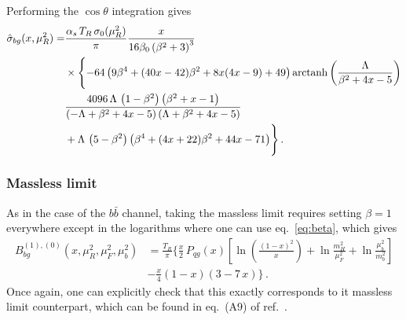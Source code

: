 Performing the $\cos\theta$ integration gives
\begin{equation}
  \begin{split}
    \hat{\sigma}_{bg}(x,\mu_R^2) =&
    \frac{\alpha_s\,T_R\,\sigma_0(\mu_R^2)}{\pi}\frac{  x}{16 \beta_0
      \left(\beta^2+3\right)^3}\\
    &\times\Biggl\{- 64 \left(9 \beta^4+(40
     x-42) \beta^2 +8 x (4 x-9)+49\right){\rm arctanh}\left(\frac{\Lambda }{\beta^2+4
       x-5}\right)   \\
    &\frac{4096\,\Lambda\, \left(1-\beta^2 \right)
      \left(\beta^2+x-1\right)} {\left(-\Lambda +\beta^2+4 x-5\right)
      \left(\Lambda +\beta^2+4 x-5\right)} \\  
    &+\Lambda\,\left(5-\beta^2\right) \left(\beta^4+(4 x+22) \beta^2+44 x-71\right)
  \Biggr\}\,.
  \end{split}
\end{equation}

\subsubsection{Massless limit}
As in the case of the $b\bar{b}$ channel, taking the massless limit
requires setting $\beta=1$ everywhere except in the logarithms where
one can use eq.~\eqref{eq:beta}, which gives
\begin{align}
  \label{eq:mlimbg}
  B_{bg}^{(1),(0)}(x,\mu_R^2,\mu_F^2,\mu_b^2) &=
  \frac{T_R}{\pi}\biggl\{  
    \frac{x}{2}\,P_{qg}(x)\left[
      \ln\left(\frac{(1-x)^2}{x}\right)+\ln\frac{m_H^2}{\mu_F^2}+
      \ln{\frac{\mu_b^2}{m_b^2}} \right]\nonumber \\ &-\frac{x}{4}(1-x)(3-7\,x) \biggr\}\,.
\end{align}
Once again, one can explicitly check that this exactly corresponds to
it massless limit counterpart, which can be found in eq.~(A9) of ref.~\cite{Harlander:2003ai}.
